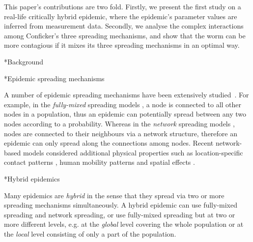 \documentclass[9pt]{article}
\makeatletter
\renewcommand{\section}{\@startsection {section}{1}{0pt}{-6pt}{1pt}{\reset@font \large \bfseries}}
\renewcommand{\subsection}{\@startsection {subsection}{2}{0pt}{-6pt}{1pt}{\reset@font \normalsize \bfseries}}
\makeatother
\begin{document}
This paper's contributions are two fold. 
Firstly, we present the first study on a {real-life} critically hybrid epidemic, where the epidemic's parameter values are inferred from measurement data.
Secondly, we analyse the complex interactions among Conficker's three spreading mechanisms, and show that the worm can be more contagious if it mixes its three spreading mechanisms in an optimal way.


\section*{Background}

\subsection*{Epidemic spreading mechanisms}

A number of epidemic spreading mechanisms have been extensively studied~\cite{Newman_Book_2010,Keeling_Eames_2005}. 
For example, in the {\em fully-mixed} spreading models \cite{Newman_Book_2010,Anderson_1991}, a node is connected to all other nodes in a population, thus an epidemic can potentially spread between any two nodes according to a probability. Whereas in the {\em network} spreading models \cite{House_2012,Rock_2014, Newman_Book_2010, Pastor-Satorras_Vespignani_2001}, nodes are connected to their neighbours via a network structure, therefore an epidemic can only spread along the connections among nodes. Recent network-based models considered additional physical properties such as location-specific contact patterns \cite{R_Wang_2013, R_Wang_2013_2}, human mobility patterns \cite{Balcan_2009b, Wang_2009, Balcan_2011, Meloni_2011} and spatial effects \cite{R_Sun_2007,R_Sun_2008,R_Sun_2010,R_Sun_2012}.

\subsection*{Hybrid epidemics}

Many epidemics are {\em hybrid} in the sense that they spread via two or more spreading mechanisms simultaneously.
A hybrid epidemic can use fully-mixed spreading and network spreading, or use  fully-mixed spreading but at two or more different levels, e.g. at the {\em global} level covering the whole population or at the {\em local} level consisting of only a part of the population.
\end{document}
